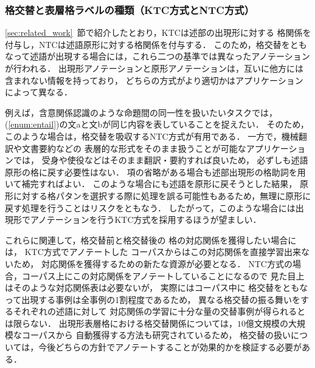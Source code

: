 \documentclass[japanese]{jnlp_1.4}
\begin{document}
\subsubsection{格交替と表層格ラベルの種類（KTC方式とNTC方式）}
\label{sec:ntc-case-ktc-case}

\ref{sec:related_work}~節で紹介したとおり，KTCは述部の出現形に対する
格関係を付与し，NTCは述語原形に対する格関係を付与する．
このため，格交替をともなって述語が出現する場合には，これら二つの基準では異なったアノテーションが行われる．
出現形アノテーションと原形アノテーションは，互いに他方には含まれない情報を持っており，
どちらの方式がより適切かはアプリケーションによって異なる．

例えば，含意関係認識のような命題間の同一性を扱いたいタスクでは，
(\ref{enum:entail})の文aと文bが同じ内容を表していることを捉えたい．
そのため，このような場合は，格交替を吸収するNTC方式が有用である．
一方で，機械翻訳や文書要約などの
表層的な形式をそのまま扱うことが可能なアプリケーションでは，
受身や使役などはそのまま翻訳・要約すれば良いため，
必ずしも述語原形の格に戻す必要性はない．
項の省略がある場合も述部出現形の格助詞を用いて補完すればよい．
このような場合にも述語を原形に戻そうとした結果，
原形に対する格パタンを選択する際に処理を誤る可能性もあるため，無理に原形に戻す処理を行うことはリスクをともなう．
したがって，このような場合には出現形でアノテーションを行うKTC方式を採用するほうが望ましい．

これらに関連して，格交替前と格交替後の
格の対応関係を獲得したい場合には，
KTC方式でアノテートした
コーパスからはこの対応関係を直接学習出来ないため，
対応関係を獲得するための新たな資源が必要となる．
NTC方式の場合，コーパス上にこの対応関係をアノテートしていることになるので
見た目上はそのような対応関係表は必要ないが，
実際にはコーパス中に
格交替をともなって出現する事例は全事例の1割程度であるため，
異なる格交替の振る舞いをするそれぞれの述語に対して
対応関係の学習に十分な量の交替事例が得られるとは限らない．
出現形表層格における格交替関係については，$10$億文規模の大規模なコーパスから
自動獲得する方法も研究されているため\cite{sasano2013}，
格交替の扱いについては，今後どちらの方針でアノテートすることが効果的かを検証する必要がある．
\end{document}
